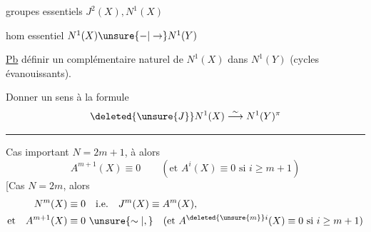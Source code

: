 groupes essentiels \qquad $J^2(X),N^1(X)$

hom essentiel \qquad $N^1(X)\unsure{\mathord{-}|\to}N^1(Y)$

\uline{Pb} définir un complémentaire naturel de $N^1(X)$ dans $N^1(Y)$ (cycles évanouissants). 

Donner un sens à la formule
\[
 \deleted{\unsure{J}}N^1(X)\overset{\sim}{\longrightarrow}N^1(Y)^{\pi}
\]

\noindent\rule{\linewidth}{0.35pt}

Cas important \qquad $N=2m+1$, à  alors
\[
 A^{m+1}(X)\equiv0\qquad(\text{et }A^i(X)\equiv0\text{ si } i\geq m+1)
\]
[Cas \qquad $N=2m$, alors
\[
\begin{aligned}
 N^m(X)&\equiv0\quad\text{i.e.}\quad J^m(X)\equiv A^m(X),\\
 \text{et}\quad A^{m+1}(X)&\equiv0\ \unsure{\sim|,}\quad
 (\text{et }A^{\deleted{\unsure{m}}i}(X)\equiv0\text{ si }i\geq m+1)
\end{aligned}
\]
